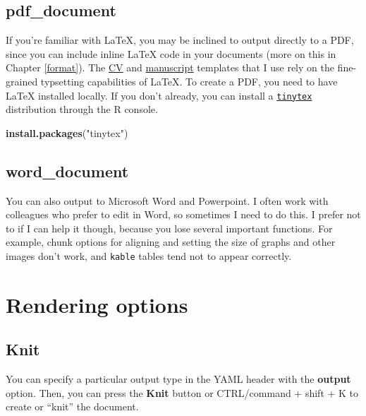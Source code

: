 \documentclass[
]{book}
\newenvironment{Shaded}{\begin{snugshade}}{\end{snugshade}}
\newcommand{\KeywordTok}[1]{\textcolor[rgb]{0.13,0.29,0.53}{\textbf{#1}}}
\newcommand{\NormalTok}[1]{#1}
\newcommand{\StringTok}[1]{\textcolor[rgb]{0.31,0.60,0.02}{#1}}
\begin{document}
\hypertarget{pdf_document}{%
\subsection{pdf\_document}\label{pdf_document}}

If you're familiar with LaTeX, you may be inclined to output directly to a PDF, since you can include inline LaTeX code in your documents (more on this in Chapter \ref{format}). The \href{https://github.com/mitchelloharawild/vitae}{CV} and \href{https://github.com/rosannav/thesis_in_rmarkdown/tree/master/example_thesis}{manuscript} templates that I use rely on the fine-grained typsetting capabilities of LaTeX. To create a PDF, you need to have LaTeX installed locally. If you don't already, you can install a \href{https://yihui.org/tinytex/}{\texttt{tinytex}} distribution through the R console.

\begin{Shaded}
\begin{Highlighting}[]
\KeywordTok{install.packages}\NormalTok{(}\StringTok{"tinytex"}\NormalTok{)}
\end{Highlighting}
\end{Shaded}

\hypertarget{word_document}{%
\subsection{word\_document}\label{word_document}}

You can also output to Microsoft Word and Powerpoint. I often work with colleagues who prefer to edit in Word, so sometimes I need to do this. I prefer not to if I can help it though, because you lose several important functions. For example, chunk options for aligning and setting the size of graphs and other images don't work, and \texttt{kable} tables tend not to appear correctly.

\hypertarget{rendering-options}{%
\section{Rendering options}\label{rendering-options}}

\hypertarget{knit}{%
\subsection{Knit}\label{knit}}

You can specify a particular output type in the YAML header with the \textbf{output} option. Then, you can press the \textbf{Knit} button or CTRL/command + shift + K to create or ``knit'' the document.
\end{document}
